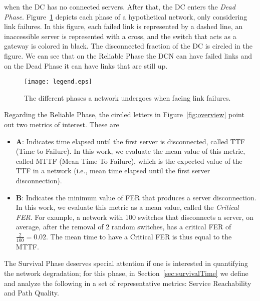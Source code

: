 when the DC has no connected servers. After that, the DC enters the \textit{Dead Phase}. Figure~\ref{fig:phases} depicts each phase of a hypothetical network, only considering link failures. In this figure, each failed link is represented by a dashed line, an inaccessible server is represented with a cross, and the switch that acts as a gateway is colored in black. The disconnected fraction of the DC is circled in the figure. We can see that on the Reliable Phase the DCN can have failed links and on the Dead Phase it can have links that are still up.
\begin{figure}
\centering
{\texttt{[image: legend.eps]}}\\
\caption{The different phases a network undergoes when facing link failures.}
\label{fig:phases}
\end{figure}

Regarding the Reliable Phase, the circled letters in Figure~\ref{fig:overview} point out two metrics of interest. These are

\begin{itemize}
\item \textbf {A}: Indicates time elapsed until the first server is disconnected, called TTF (Time to Failure). In this work, we evaluate the mean value of this metric, called MTTF (Mean Time To Failure), which is the expected value of the TTF in a network (i.e., mean time elapsed until the first server disconnection).
\item \textbf {B}: Indicates the minimum value of FER that produces a server disconnection. In this work, we evaluate this metric as a mean value, called the \textit{Critical FER}. 
For example, a network with 100 switches that disconnects a server, on average, after the removal of 2 random switches, has a critical FER of $\frac{2}{100}=0.02$. The mean time to have a Critical FER is thus equal to the MTTF.
\end{itemize}

The Survival Phase deserves special attention if one is interested in quantifying the network degradation; for this phase, in Section~\ref{sec:survivalTime} we define and analyze the following in a set of representative metrics: Service Reachability and Path Quality.

